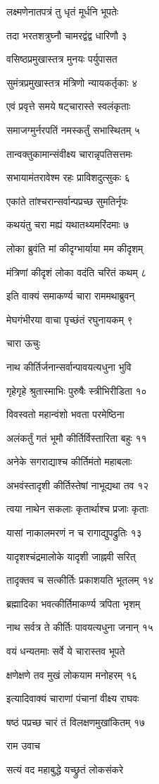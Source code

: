 लक्ष्मणेनातपत्रं तु धृतं मूर्धनि भूपतेः

तदा भरतशत्रुघ्नौ चामरद्वंद्व धारिणौ ३

वसिष्ठप्रमुखास्तत्र मुनयः पर्युपासत

सुमंत्रप्रमुखास्तत्र मंत्रिणो न्यायकर्तृकाः ४

एवं प्रवृत्ते समये षट्चारास्ते स्वलंकृताः

समाजग्मुर्नरपतिं नमस्कर्तुं सभास्थितम् ५

तान्वक्तुकामान्संवीक्ष्य चारान्नृपतिसत्तमः

सभायामंतरावेश्म रहः प्राविशदुत्सुकः ६

एकांते तांश्चरान्सर्वान्पप्रच्छ सुमतिर्नृपः

कथयंतु चरा मह्यं यथातथ्यमरिंदमाः ७

लोका ब्रुवंति मां कीदृग्भार्याया मम कीदृशम्

मंत्रिणां कीदृशं लोका वदंति चरितं कथम् ८

इति वाक्यं समाकर्ण्य चारा राममथाब्रुवन्

मेघगंभीरया वाचा पृच्छंतं रघुनायकम् ९

चारा ऊचुः

नाथ कीर्तिर्जनान्सर्वान्पावयत्यधुना भुवि

गृहेगृहे श्रुतास्माभिः पुरुषैः स्त्रीभिरीडिता १०

विवस्वतो महान्वंशो भवता परमेष्ठिना

अलंकर्तुं गतं भूमौ कीर्तिर्विस्तारिता बहुः ११

अनेके सगराद्याश्च कीर्तिमंतो महाबलाः

अभवंस्तादृशी कीर्तिस्तेषां नाभूद्यथा तव १२

त्वया नाथेन सकलाः कृतार्थाश्च प्रजाः कृताः

यासां नाकालमरणं न च रागाद्युपद्रुतिः १३

यादृशश्चंद्रमालोके यादृशी जाह्नवी सरित्

तादृक्तव च सत्कीर्तिः प्रकाशयति भूतलम् १४

ब्रह्मादिका भवत्कीर्तिमाकर्ण्य त्रपिता भृशम्

नाथ सर्वत्र ते कीर्तिः पावयत्यधुना जनान् १५

वयं धन्यतमाः सर्वे ये चारास्तव भूपते

क्षणेक्षणे तव मुखं लोकयाम मनोहरम् १६

इत्यादिवाक्यं चाराणां पंचानां वीक्ष्य राघवः

षष्ठं पप्रच्छ चारं तं विलक्षणमुखांकितम् १७

राम उवाच

सत्यं वद महाबुद्धे यच्छ्रुतं लोकसंकरे

